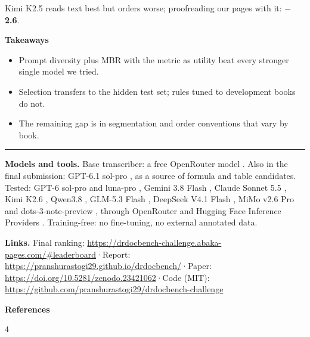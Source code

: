 \documentclass{article}
\newcommand{\dn}[1]{\textcolor{red!65!black}{\textbf{#1}}}
\begin{document}
\begin{minipage}[t]{245mm}
Kimi K2.5 \citep{kimik25} reads text best but orders worse; proofreading our pages with it: \dn{$-$2.6}.

\begin{keybox}
\textbf{\textcolor{accent}{Takeaways}}
\begin{itemize}
  \item Prompt diversity plus MBR with the metric as utility beat every stronger single model we tried.
  \item Selection transfers to the hidden test set; rules tuned to development books do not.
  \item The remaining gap is in segmentation and order conventions that vary by book.
\end{itemize}
\end{keybox}
\end{minipage}

\vfill
{\color{accent}\rule{\linewidth}{1mm}}\par\vspace{4mm}
{\fontsize{21}{27}\selectfont
\textbf{\textcolor{accent}{Models and tools.}} Base transcriber: a free OpenRouter model \citep{stealthmodel}. Also in the final submission: GPT-6.1 sol-pro \citep{gpt61solpro}, as a source of formula and table candidates. Tested: GPT-6 sol-pro and luna-pro \citep{gpt6solpro,gpt6lunapro}, Gemini 3.8 Flash \citep{gemini38flash}, Claude Sonnet 5.5 \citep{claudesonnet55}, Kimi K2.6 \citep{kimik26}, Qwen3.8 \citep{qwen38}, GLM-5.3 Flash \citep{glm53flash}, DeepSeek V4.1 Flash \citep{deepseekv41}, MiMo v2.6 Pro \citep{mimo26pro} and dots-3-note-preview \citep{dots3note}, through OpenRouter \citep{openrouter} and Hugging Face Inference Providers \citep{hfinference}. Training-free: no fine-tuning, no external annotated data.\par}
\vspace{2mm}
{\fontsize{22}{27}\selectfont\raggedright\textbf{\textcolor{accent}{Links.}} Final ranking: \url{https://drdocbench-challenge.abaka-pages.com/\#leaderboard}\enspace·\enspace Report: \url{https://pranshurastogi29.github.io/drdocbench/}\enspace·\enspace Paper: \url{https://doi.org/10.5281/zenodo.23421062}\enspace·\enspace Code (MIT): \url{https://github.com/pranshurastogi29/drdocbench-challenge}\par}
\vspace{3mm}
{\fontsize{26}{30}\selectfont\bfseries\textcolor{accent}{References}}\par\vspace{-2mm}
\setlength{\columnsep}{12mm}
\begin{multicols}{4}


\end{multicols}
\end{document}
